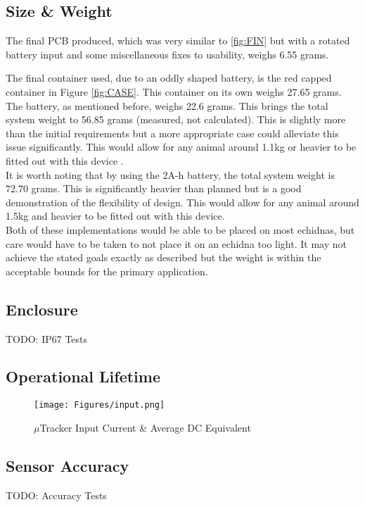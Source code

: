 \documentclass[12pt,openany,a4paper]{book}
\begin{document}
		\subsection{Size \& Weight}
		The final PCB produced, which was very similar to \ref{fig:FIN} but with a rotated battery input and some miscellaneous fixes to usability, weighs 6.55 grams.
		
		The final container used, due to an oddly shaped battery, is the red capped container in Figure \ref{fig:CASE}. This container on its own weighs 27.65 grams. \\
		
		The battery, as mentioned before, weighs 22.6 grams. This brings the total system weight to 56.85 grams (measured, not calculated). This is slightly more than the initial requirements but a more appropriate case could alleviate this issue significantly. This would allow for any animal around 1.1kg or heavier to be fitted out with this device \cite{Mamm87}. \\
		
		It is worth noting that by using the 2A-h battery, the total system weight is 72.70 grams. This is significantly heavier than planned but is a good demonstration of the flexibility of design. This would allow for any animal around 1.5kg and heavier to be fitted out with this device. \\
		
		Both of these implementations would be able to be placed on most echidnas, but care would have to be taken to not place it on an echidna too light. It may not achieve the stated goals exactly as described but the weight is within the acceptable bounds for the primary application.
		\subsection{Enclosure}
		TODO: IP67 Tests
		\subsection{Operational Lifetime}
		
			\begin{figure}[H]
				\centering
				\texttt{[image: Figures/input.png]}
				\caption{$\mu$Tracker Input Current \& Average DC Equivalent}
				\label{fig:input}
			\end{figure}	
			
		\subsection{Sensor Accuracy}
		TODO: Accuracy Tests
\end{document}
